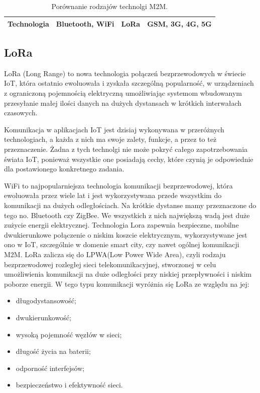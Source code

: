 \documentclass[12pt, a4paper, twoside]{report}
\begin{document}
\begin{table}[!htbp]
{\begin{tabular}{|l|l|l|l|}
  \textbf{Technologia} & Bluetooth, WiFi                                                                                                   & LoRa                                                                                                & GSM, 3G, 4G, 5G                                                                                                 \\ \hline
  \end{tabular}%
  }
  \caption{Porównanie rodzajów technolgi M2M.\cite{LoRa-article}}
\end{table}

\subsection{LoRa}
\hspace{1cm}LoRa (Long Range) to nowa technologia połączeń bezprzewodowych w świecie IoT, która ostatnio ewoluowała i zyskała szczególną popularność, w urządzeniach z ograniczoną pojemnością elektryczną umożliwiając systemom wbudowanym przesyłanie małej ilości danych na dużych dystansach w krótkich interwałach czasowych.

\hspace{1cm}Komunikacja w aplikacjach IoT jest dzisiaj wykonywana w przeróżnych technologiach, a każda z nich ma swoje zalety, funkcje, a przez to też przeznaczenie. Żadna z tych technolgi nie może pokryć całego zapotrzebowania świata IoT, ponieważ wszystkie one posiadają cechy, które czynią je odpowiednie dla postawionego konkretnego zadania.

\hspace{1cm}WiFi to najpopularniejsza technologia komunikacji bezprzewodowej, która ewoluowała przez wiele lat i jest wykorzystywana przede wszystkim do komunikacji na dużych
odległościach. Na krótkie dystanse mamy przeznaczone do tego no. Bluetooth czy ZigBee. We wszystkich z nich największą wadą jest duże zużycie energii elektrycznej. Technologia Lora zapewnia bezpieczne, mobilne dwukierunkowe połączenie o niskim koszcie elektrycznym, wykorzystywane jest ono w IoT, szczególnie w domenie smart city, czy nawet ogólnej komunikacji M2M. LoRa zalicza się do LPWA(Low Power Wide Area), czyli rodzaju bezprzewodowej rozległej sieci telekomunikacyjnej, stworzonej w celu umożliwienia komunikacji na duże odległości przy niskiej przepływności i niskim poborze energii. \cite{LPWA-wiki} W tego typu komunikacji wyróżnia się LoRa ze względu na jej:
\begin{itemize}
  \item długodystansowość;
  \item dwukierunkowość;
  \item wysoką pojemność węzłów w sieci;
  \item długość życia na baterii;
  \item odporność interfejsów;
  \item bezpieczeństwo i efektywność sieci. \cite{LoRa-article}
\end{itemize}
\end{document}
